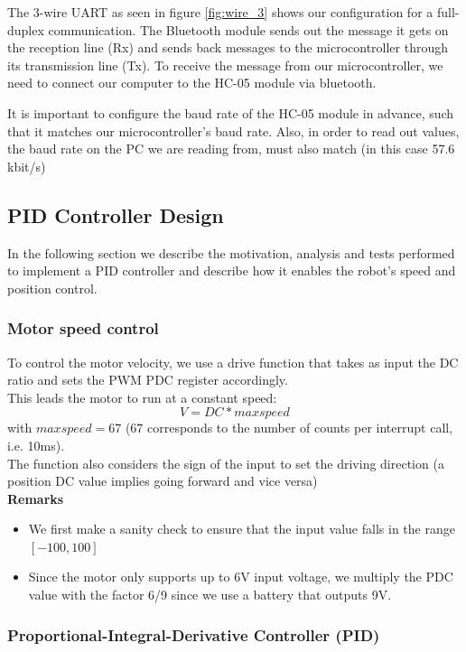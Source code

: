 The 3-wire UART as seen in figure \ref{fig:wire_3} shows our configuration for a full-duplex communication. The Bluetooth module sends out the message it gets on the reception line (Rx) and sends back messages to the microcontroller through its transmission line (Tx). To receive the message from our microcontroller, we need to connect our computer to the HC-05 module via bluetooth.

It is important to configure the baud rate of the HC-05 module in advance, such that it matches our microcontroller's baud rate. Also, in order to read out values, the baud rate on the PC we are reading from, must also match (in this case 57.6 kbit/s)

\newpage
\subsection{PID Controller Design}

In the following section we describe the motivation, analysis and tests performed to implement a PID controller and describe how it enables the robot's speed and position control.

\subsubsection{Motor speed control}
To control the motor velocity, we use a drive function that takes as input the DC ratio and sets the PWM PDC register accordingly. \\
\noindent
This leads the motor to run at a constant speed: $$V=DC*maxspeed$$ with $maxspeed=67$ ($67$ corresponds to the number of counts per interrupt call, i.e. 10ms). \\
\vskip 0.2in
\noindent
The function also considers the sign of the input to set the driving direction (a position DC value implies going forward and vice versa)\\
\vskip 0.2in
\noindent
\textbf{Remarks}
\begin{itemize}
    \item We first make a sanity check to ensure that the input value falls in the range $[-100, 100]$
    \item Since the motor only supports up to 6V input voltage, we multiply the PDC value with the factor 6/9 since we use a battery that outputs 9V.
\end{itemize}


\subsubsection{Proportional-Integral-Derivative Controller (PID)}

